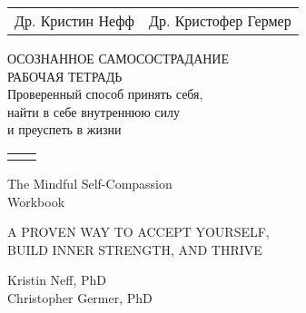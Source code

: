 
\begin{titlepage}	
	\begin{center}	
		\begin{tabularx}{\textwidth}{Xr}
			Др. Кристин Нефф & Др. Кристофер Гермер \\
		\end{tabularx}
		
		\vfill
		
		{\Huge ОСОЗНАННОЕ САМОСОСТРАДАНИЕ\\[1cm]}
		{\Large РАБОЧАЯ ТЕТРАДЬ\\[2cm]}
		{\Large Проверенный способ принять себя,\\ найти в себе внутреннюю силу\\ и преуспеть в жизни\\}
			
		\vfill
		\vfill
	\end{center}
\end{titlepage}
	
\begin{titlepage}		
		\begin{center}
		\begin{tabularx}{\textwidth}{Xr}
			 &  \\
		\end{tabularx}

		\vspace{10ex}
	
		{\Huge The Mindful Self-Compassion\\}
		{\Huge Workbook\\}
		
		\vspace{10ex}
		
		{\large A PROVEN WAY TO ACCEPT YOURSELF,\\BUILD INNER STRENGTH, AND THRIVE\\}
		
		\vfill
		
		Kristin Neff, PhD\\
		Christopher Germer, PhD	
	\end{center}
\end{titlepage}
